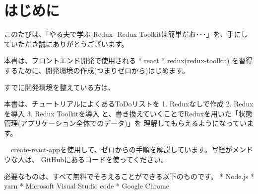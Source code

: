\chapter{はじめに}
\label{chap:00-preface}

このたびは、「やる夫で学ぶ{-}Redux{-} Redux Toolkitは簡単だお･･･」を、手にしていただき誠にありがとうございます。

本書は、フロントエンド開発で使用される
* react
* redux(redux{-}toolkit)
を習得するために、開発環境の作成(つまりゼロから)はじめます。

すでに開発環境を整えている方は、

本書は、チュートリアルによくあるToDoリストを
1. Reduxなしで作成
2. Reduxを導入
3. Redux Toolkitを導入
と、書き換えていくことでReduxを用いた「状態管理(アプリケーション全体でのデータ)」を
理解してもらえるようになっています。

　create{-}react{-}appを使用して、ゼロからの手順を解説しています。写経がメンドウな人は、
GitHubにあるコードを使ってください。

必要なものは、すべて無料でそろえることができる以下のものです。
* Node.js
* yarn
* Microsoft Visual Studio code
* Google Chrome
